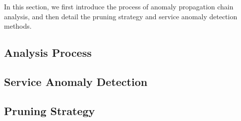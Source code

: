 In this section, we first introduce the process of anomaly propagation chain analysis, and then detail the pruning strategy and service anomaly detection methods.

\subsection{Analysis Process}\label{sec:process}


\subsection{Service Anomaly Detection}\label{sec:anomaly}


\subsection{Pruning Strategy}\label{sec:pruning}

